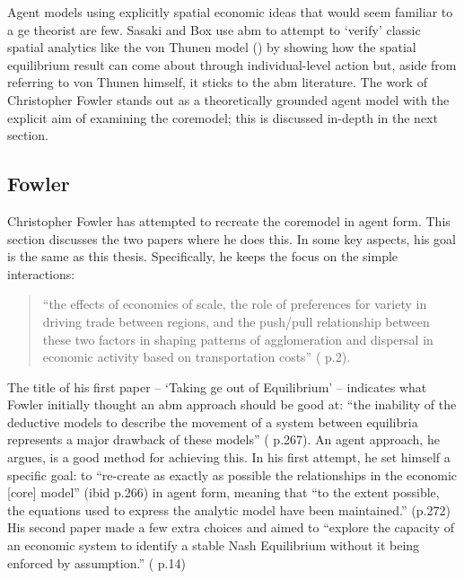 Agent models using explicitly spatial economic ideas that would seem familiar to a \gls{ge} theorist are few. Sasaki and Box  use \gls{abm} to attempt to `verify' classic spatial analytics like the von Thunen model (\citealt{sasaki_agent-based_2003}) by showing how the spatial equilibrium result can come about through individual-level action but, aside from referring to von Thunen himself, it sticks to the \gls{abm} literature. The work of Christopher Fowler stands out as a theoretically grounded agent model with the explicit aim of examining the \gls{coremodel}; this is discussed in-depth in the next section.

\subsection{Fowler \label{sec:fowler}}

Christopher Fowler has attempted to recreate the \gls{coremodel} in agent form. This section discusses the two papers where he does this. In some key aspects, his goal is the same as this thesis. Specifically, he keeps the focus on the simple interactions:

\begin{quote}
``the effects of economies of scale, the role of preferences for variety in driving trade between regions, and the push/pull relationship between these two factors in shaping patterns of agglomeration and dispersal in economic activity based on transportation costs'' (\citealt{fowler_finding_2011} p.2).
\end{quote}

The title of his first paper – `Taking \gls{ge} out of Equilibrium' – indicates what Fowler initially thought an \gls{abm} approach should be good at: ``the inability of the deductive models to describe the movement of a system between equilibria represents a major drawback of these models'' (\citealt{fowler_taking_2007} p.267). An agent approach, he argues, is a good method for achieving this. In his first attempt, he set himself a specific goal: to ``re-create as exactly as possible the relationships in the economic [core] model'' (ibid p.266) in agent form, meaning that ``to the extent possible, the equations used to express the analytic model have been maintained.'' (p.272) His second paper made a few extra choices and aimed to ``explore the capacity of an economic system to identify a stable Nash Equilibrium without it being enforced by assumption.'' (\citealt{fowler_finding_2011} p.14)

